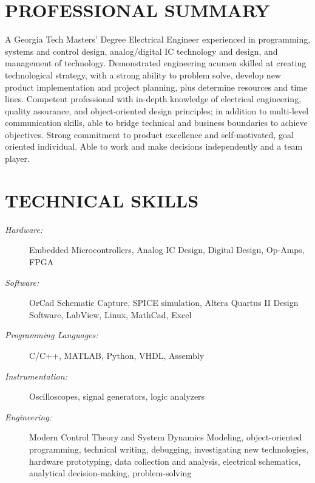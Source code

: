 \documentclass{res}
\begin{document}
 


\address{robert.savage3@gmail.com / (404)-434-3286 / \url{www.linkedin.com/in/robertmorgansavage/en}}


\begin{resume}

\section{PROFESSIONAL SUMMARY}          
    A Georgia Tech Masters' Degree Electrical Engineer experienced in programming, systems and control design, analog/digital IC technology and design, and management of technology.  Demonstrated engineering acumen skilled at creating technological strategy, with a strong ability to problem solve, develop new product implementation and project planning, plus determine resources and time lines.  Competent professional with in-depth knowledge of electrical engineering, quality assurance, and object-oriented design principles; in addition to multi-level communication skills, able to bridge technical and business boundaries to achieve objectives.  Strong commitment to product excellence and self-motivated, goal oriented individual.  Able to work and make decisions independently and a team player.          

\section{TECHNICAL SKILLS}
	\begin{description}
	 	\item[\textit{Hardware:}] Embedded Microcontrollers, Analog IC Design, Digital Design, Op-Amps, FPGA
   		\item [\textit{Software:}]  OrCad Schematic Capture, SPICE simulation, Altera Quartus II Design Software, LabView, Linux,  MathCad, Excel
   		\item[\textit{Programming Languages:}]C/C++, MATLAB, Python, VHDL, Assembly 
   		\item[\textit{Instrumentation:}] Oscilloscopes, signal generators, logic analyzers
   		\item[\textit{Engineering:}]  Modern Control Theory and System Dynamics Modeling, object-oriented programming, technical writing, debugging, investigating new technologies, hardware prototyping, data collection and analysis, electrical schematics, analytical decision-making, problem-solving    
    \end{description}
 

\end{resume}
\end{document}
